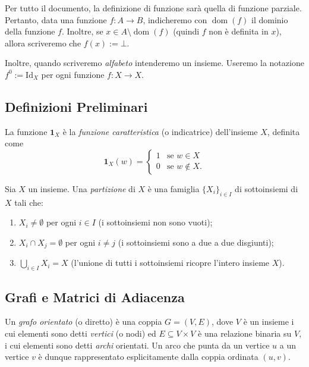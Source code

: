 Per tutto il documento, la definizione di funzione sarà quella di funzione parziale. Pertanto, data una funzione $f: A \to B$, indicheremo con $\operatorname{dom}(f)$ il dominio della funzione $f$. Inoltre, se $x \in A \setminus \operatorname{dom}(f)$ (quindi $f$ non è definita in $x$), allora scriveremo che $f(x):=\bot$.

Inoltre, quando scriveremo \textit{alfabeto} intenderemo un insieme.
Useremo la notazione $f^0:=\mathrm{Id}_X$ per ogni funzione $f:X \to X$. 

\subsection{Definizioni Preliminari}

\begin{defi}
La funzione $\mathbf{1}_X$ è la \textit{funzione caratteristica} (o indicatrice) dell'insieme $X$, definita come
\[\mathbf{1}_X(w) = \begin{cases} 1 & \text{se } w \in X \\ 0 & \text{se } w \notin X. \end{cases}\]
\end{defi}

\begin{defi}[Partizione]
Sia $X$ un insieme. Una \emph{partizione} di $X$ è una famiglia $\{X_i\}_{i \in I}$ di sottoinsiemi di $X$ tali che:
\begin{enumerate}
    \item $X_i \neq \emptyset$ per ogni $i \in I$ (i sottoinsiemi non sono vuoti);
    \item $X_i \cap X_j = \emptyset$ per ogni $i \neq j$ (i sottoinsiemi sono a due a due disgiunti);
    \item $\bigcup_{i \in I} X_i = X$ (l'unione di tutti i sottoinsiemi ricopre l'intero insieme $X$).
\end{enumerate}
\end{defi}

\subsection{Grafi e Matrici di Adiacenza}

\begin{defi}
Un \emph{grafo orientato} (o diretto) è una coppia $G = (V, E)$, dove $V$ è un insieme i cui elementi sono detti \emph{vertici} (o nodi) ed $E \subseteq V \times V$ è una relazione binaria su $V$, i cui elementi sono detti \emph{archi} orientati. Un arco che punta da un vertice $u$ a un vertice $v$ è dunque rappresentato esplicitamente dalla coppia ordinata $(u, v)$.
\end{defi}


